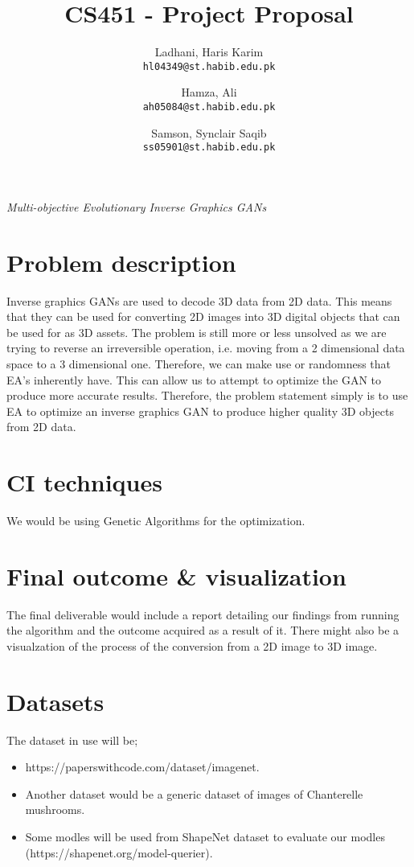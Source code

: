 \documentclass[11pt,letterpaper]{article}
\begin{document}
\title{CS451 - Project Proposal}
\author{Ladhani, Haris Karim\\
\texttt{hl04349@st.habib.edu.pk}
\and
Hamza, Ali\\
\texttt{ah05084@st.habib.edu.pk}
\and
Samson, Synclair Saqib\\
\texttt{ss05901@st.habib.edu.pk}
}
\maketitle

\begin{center}
  \emph{Multi-objective Evolutionary Inverse Graphics GANs}
\end{center}


\section*{Problem description}
Inverse graphics GANs are used to decode 3D data from 2D data. This means that they can be used for converting 2D images into 3D digital objects that can be used for as 3D assets. The problem is still more or less unsolved as we are trying to reverse an irreversible operation, i.e. moving from a 2 dimensional data space to a 3 dimensional one. Therefore, we can make use or randomness that EA's inherently have. This can allow us to attempt to optimize the GAN to produce more accurate results. Therefore, the problem statement simply is to use EA to optimize an inverse graphics GAN to produce higher quality 3D objects from 2D data.

\section*{CI techniques}
We would be using Genetic Algorithms for the optimization.

\section*{Final outcome \& visualization}
The final deliverable would include a report detailing our findings from running the algorithm and the outcome acquired as a result of it. There might also be a visualzation of the process of the conversion from a 2D image to 3D image.

\section*{Datasets} 
The dataset in use will be;
\begin{itemize}
    \item https://paperswithcode.com/dataset/imagenet.
    \item Another dataset would be a generic dataset of images of Chanterelle mushrooms.
    \item Some modles will be used from ShapeNet dataset to evaluate our modles (https://shapenet.org/model-querier).
\end{itemize}
\end{document}
